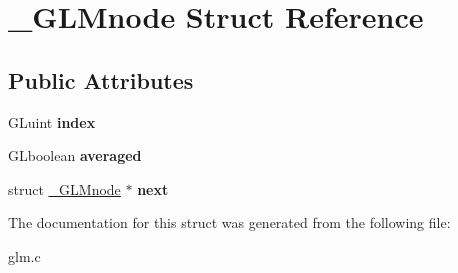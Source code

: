 \hypertarget{struct__GLMnode}{\section{\-\_\-\-G\-L\-Mnode \-Struct \-Reference}
\label{struct__GLMnode}
}
\subsection*{\-Public \-Attributes}
\begin{DoxyCompactItemize}
\item 
\hypertarget{struct__GLMnode_a623dff51dc67366e5fa2e3b27a12eb5a}{\-G\-Luint {\bfseries index}}\label{struct__GLMnode_a623dff51dc67366e5fa2e3b27a12eb5a}

\item 
\hypertarget{struct__GLMnode_a24056262ae27d98869a9ddb9aee71f26}{\-G\-Lboolean {\bfseries averaged}}\label{struct__GLMnode_a24056262ae27d98869a9ddb9aee71f26}

\item 
\hypertarget{struct__GLMnode_a425191d3e6f9827ebd213b5f289990ae}{struct \hyperlink{struct__GLMnode}{\-\_\-\-G\-L\-Mnode} $\ast$ {\bfseries next}}\label{struct__GLMnode_a425191d3e6f9827ebd213b5f289990ae}

\end{DoxyCompactItemize}


\-The documentation for this struct was generated from the following file\-:\begin{DoxyCompactItemize}
\item 
glm.\-c\end{DoxyCompactItemize}
